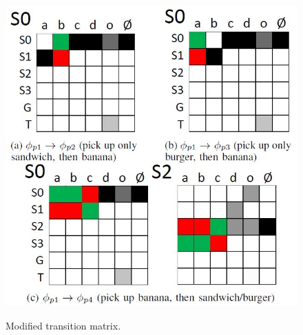 \documentclass[letterpaper, 10 pt, conference]{ieeeconf}  %
\begin{document}
\begin{figure}[h]
 \centering
 \includegraphics[scale=.5]{JacoArmTM.JPG}\\
 \caption{Modified transition matrix.}
\end{figure}
\end{document}
